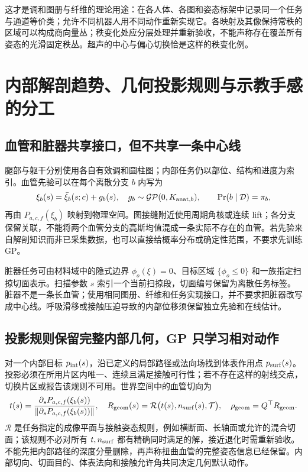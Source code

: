 \documentclass[11pt,a4paper]{article}
\numberwithin{equation}{section}
\theoremstyle{definition}
\begin{document}
这才是调和图册与纤维的理论用途：在各人体、各图和姿态标架中记录同一个任务与通道等价类；允许不同机器人用不同动作重新实现它。各映射及其像保持常秩的区域可以构成商向量丛；秩变化处应分层处理并重新验收，不能声称存在覆盖所有姿态的光滑固定秩丛。超声的中心与偏心切换恰是这样的秩变化例。

\section{内部解剖趋势、几何投影规则与示教手感的分工}
\label{sec:v43:anatomy-rules}
\subsection{血管和脏器共享接口，但不共享一条中心线}
腿部与躯干分别使用各自有效调和圆柱图；内部任务仍以部位、结构和进度为索引。血管先验可以在每个离散分支 $b$ 内写为
\begin{equation}
 \xi_b(s)=\bar\xi_b(s;c)+g_b(s),\quad
 g_b\sim\mathcal{GP}(0,K_{{\rm anat},b}),\qquad
 \Pr(b\mid\mathcal D)=\pi_b,
\end{equation}
再由 $P_{a,c,f}(\xi_b)$ 映射到物理空间。图接缝附近使用周期角核或连续 lift；各分支保留关联，不能将两个血管分支的高斯均值混成一条实际不存在的血管。若先验来自解剖知识而非已采集数据，也可以直接给概率分布或确定性范围，不要求先训练 GP。

脏器任务可由材料域中的隐式边界 $\phi_o(\xi)=0$、目标区域 $\{\phi_o\le0\}$ 和一族指定扫掠切面表示。扫描参数 $s$ 索引一个当前扫掠段，切面编号保留为离散任务标签。脏器不是一条长血管；使用相同图册、纤维和任务实现接口，并不要求把脏器改写成中心线。呼吸滑移或接触压迫导致的内部位移须保留独立先验和在线估计。

\subsection{投影规则保留完整内部几何，GP 只学习相对动作}
对一个内部目标 $p_{\rm int}(s)$，沿已定义的局部路径或法向场找到体表作用点 $p_{\rm surf}(s)$。投影必须在所用片区内唯一、连续且满足接触可行性；若不存在这样的射线交点，切换片区或报告该规则不可用。世界空间中的血管切向为
\begin{equation}
 t(s)=\frac{\partial_s P_{a,c,f}(\xi_b(s))}
 {\|\partial_s P_{a,c,f}(\xi_b(s))\|},
 \quad R_{\rm geom}(s)=\mathcal R\bigl(t(s),n_{\rm surf}(s),\mathcal T\bigr),
 \quad \rho_{\rm geom}=Q^\top R_{\rm geom}.
\end{equation}
$\mathcal R$ 是任务指定的成像平面与接触姿态规则，例如横断面、长轴面或允许的混合切面；该规则不必对所有 $t,n_{\rm surf}$ 都有精确同时满足的解，接近退化时需重新验收。不能先把内部路径的深度分量删除，再声称扭曲血管的完整姿态信息已经保留。内部切向、切面目的、体表法向和接触允许角共同决定几何默认动作。
\end{document}

